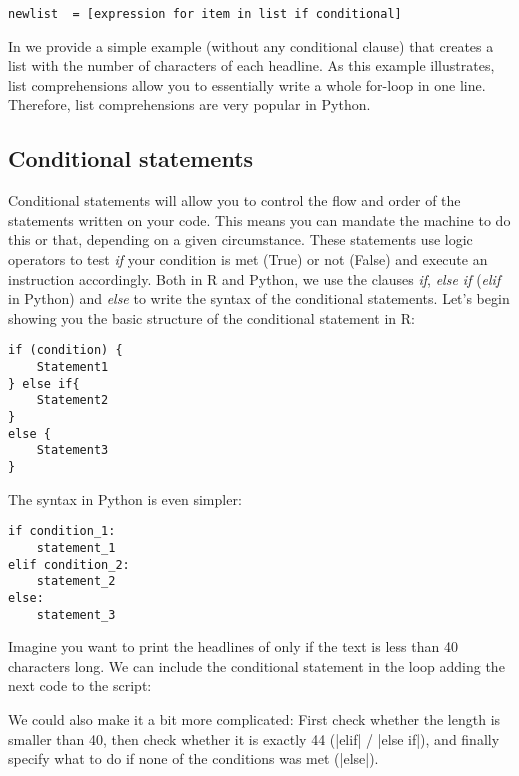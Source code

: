 \begin{verbatim}
newlist  = [expression for item in list if conditional]
\end{verbatim}

In  we provide a simple example (without any
conditional clause) that creates a list with the number of characters
of each headline. As this example illustrates, list comprehensions
allow you to essentially write a whole for-loop in one
line. Therefore, list comprehensions are very popular in Python.




\subsection{Conditional statements}

Conditional statements will allow you to control the flow and order of
the statements written on your code. This means you can mandate the
machine to do this or that, depending on a given circumstance. These
statements use logic operators to test \emph{if} your condition is met
(True) or not (False) and execute an instruction accordingly. Both in
R and Python, we use the clauses \emph{if}, \emph{else if}
(\emph{elif} in Python) and \emph{else} to write the syntax of the
conditional statements. Let's begin showing you the basic structure of
the conditional statement in R:

\begin{verbatim}
if (condition) {
    Statement1
} else if{
    Statement2
}
else {
    Statement3
}
\end{verbatim}

The syntax in Python is even simpler:

\begin{verbatim}
if condition_1:
    statement_1
elif condition_2:
    statement_2
else:
    statement_3
\end{verbatim}

Imagine you want to print the headlines of  only if the text is less than 40 characters long. We can include the conditional statement in the loop adding the next code to the script:


We could also make it a bit more complicated: First check whether the length is smaller than 40, then check whether it is exactly 44 (|elif| / |else if|), and finally specify what to do if none of the conditions was met (|else|).

